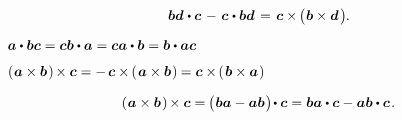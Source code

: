 \nopagebreak\vspace{-1.2em}\begin{equation}
\bm{b} \bm{d} \hspace{.1ex} \dotp \bm{c} \hspace{.25ex} - \hspace{.25ex} \bm{c} \hspace{.1ex} \dotp \bm{b} \bm{d}
\hspace{.25ex} = \hspace{.25ex}
\bm{c} \times \hspace{-0.2ex} \bigl( \hspace{.1ex} \bm{b} \times \bm{d} \hspace{.25ex} \bigr)
\hspace{-0.1ex} .
\end{equation}

\noindent ${
\bm{a} \dotp \bm{b} \bm{c} = \bm{c} \bm{b} \dotp \bm{a} = \bm{c} \bm{a} \dotp \bm{b} = \bm{b} \dotp \bm{a} \bm{c}
}$

\noindent ${
\left(\hspace{.1ex} \bm{a} \times \bm{b} \hspace{.2ex}\right) \hspace{-0.2ex} \times \bm{c}
= - \hspace{.33ex} \bm{c} \times \hspace{-0.15ex} \left(\hspace{.2ex}{\bm{a} \times \bm{b}}\hspace{.15ex}\right) \hspace{-0.1ex}
= \bm{c} \times \hspace{-0.2ex} \left(\hspace{.2ex}{\bm{b} \times \bm{a}}\hspace{.15ex}\right)
}$

\vspace{-0.15em}\noindent
\textcolor{magenta}{ }

\nopagebreak\vspace{-0.2em}\begin{equation}
\left(\hspace{.1ex} \bm{a} \times \bm{b} \hspace{.2ex}\right) \hspace{-0.2ex} \times \bm{c}
= \hspace{-0.15ex} \bigl( \hspace{.1ex} \bm{b} \bm{a} - \bm{a} \bm{b} \hspace{.15ex} \bigr) \hspace{-0.3ex} \dotp \bm{c}
= \bm{b} \bm{a} \dotp \bm{c} - \bm{a} \bm{b} \dotp \bm{c}
\hspace{.2ex} .
\end{equation}

